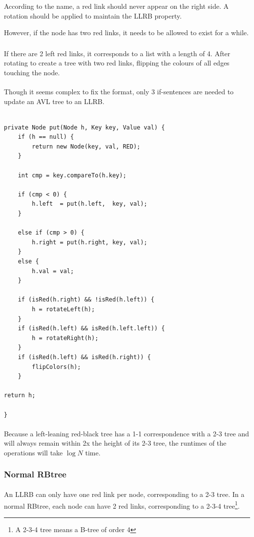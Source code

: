 \documentclass{article}
\begin{document}
\subparagraph{}
According to the name, a red link should never appear on the right side. A rotation should be applied to maintain the LLRB property.

However, if the node has two red links, it needs to be allowed to exist for a while.

\subparagraph{}
If there are 2 left red links, it corresponds to a list with a length of 4. After rotating to create a tree with two red links, flipping the colours of all edges touching the node.

\paragraph{}
Though it seems complex to fix the format, only 3 if-sentences are needed to update an AVL tree to an LLRB.

\begin{verbatim}

private Node put(Node h, Key key, Value val) {
    if (h == null) {
        return new Node(key, val, RED);
    }

    int cmp = key.compareTo(h.key);

    if (cmp < 0) {
        h.left  = put(h.left,  key, val);
    }

    else if (cmp > 0) {
        h.right = put(h.right, key, val);
    }
    else {
        h.val = val;
    }

    if (isRed(h.right) && !isRed(h.left)) {
        h = rotateLeft(h);
    }
    if (isRed(h.left) && isRed(h.left.left)) {
        h = rotateRight(h);
    }
    if (isRed(h.left) && isRed(h.right)) {
        flipColors(h);
    } 

return h;

}
\end{verbatim}

\paragraph{}
Because a left-leaning red-black tree has a 1-1 correspondence with a 2-3 tree and will always remain within 2x the height of its 2-3 tree, the runtimes of the operations will take $\log{N}$ time.

\subsubsection{Normal RBtree}

\paragraph{}
An LLRB can only have one red link per node, corresponding to a 2-3 tree. In a normal RBtree, each node can have 2 red links, corresponding to a 2-3-4 tree\footnote{A 2-3-4 tree means a B-tree of order 4}.
\end{document}
